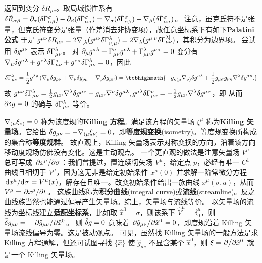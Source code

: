 返回到变分 $\delta R_{\mu\nu}$。取局域惯性系有 $\delta\tilde R_{\alpha\beta} = \tilde{\partial}_\sigma(\delta\tilde\Gamma^\sigma_{\alpha\beta})-\tilde{\partial}_\beta(\delta\tilde \Gamma^\sigma_{\alpha\sigma}) = \nabla_\sigma(\delta\tilde\Gamma^\sigma_{\alpha\beta})-\nabla_\beta(\delta\tilde \Gamma^\sigma_{\alpha\sigma})$。
注意，虽克氏符不是张量，但克氏符变分是张量（作差消去非协变项），故任意坐标系下有如下\textbf{Palatini 公式}
于是 $g^{\mu\nu}\var R_{\mu\nu}=2 \nabla_{[\lambda}( g^{\mu\nu} \delta \Gamma_{\nu]\mu}^\lambda) =2\nabla_\lambda(g^{\mu [\nu} \delta \Gamma_{\mu \nu}^{\lambda]})$，其积分为边界项。
尝试用 $\var g^{\mu\nu}$ 表示 $\var\Gamma_{\mu \nu}^\lambda$。
对 $\partial_\mu g^{\sigma\lambda}+\Gamma^\sigma_{\mu\nu} g^{\nu\lambda}+\Gamma^\lambda_{\mu\nu} g^{\nu\sigma}=0$ 变分有 $\nabla_\mu \delta g^{\sigma\lambda}+g^{\nu\lambda}\delta \Gamma^\sigma_{\mu\nu} +g^{\nu\sigma}\delta \Gamma^\lambda_{\mu\nu} =0$，因此
\[\var\Gamma_{\mu \nu}^\lambda=
\frac12 g^{\lambda\rho}
\left(
\cd_\mu \delta g_{\rho\nu}
+
\cd_\nu \delta g_{\rho\mu}
-
\cd_\rho \delta g_{\mu\nu}
\right)
=\tcbhighmath{
    -g_{\kappa(\mu} \cd_{\nu)}\delta g^{\kappa \lambda}+\frac 12 g_{\mu \sigma} g_{\nu \kappa} \cd^\lambda\delta g^{\sigma\kappa}.
}\]
故 $g^{\mu \nu} \delta \Gamma_{\mu \nu}^{\lambda}=\frac12 g_{\mu\nu}\nabla^\lambda \delta g^{\mu\nu}-g_{\mu\nu}\nabla^\nu\delta g^{\mu\lambda},g^{\mu \lambda} \delta \Gamma_{\mu \nu}^{\nu}=-\frac12 g_{\mu\nu}\nabla^\lambda \delta g^{\mu\nu}$，即
从而 $\partial\delta g=0$ 的确与 $\var\Gamma_{\mu \nu}^\lambda$ 等价。



$\nabla_{(\mu}\xi_{\nu)}=0$ 称为该度规的\textbf{Killing 方程}。满足该方程的矢量场 $\xi^\mu$ 称为\textbf{Killing 矢量场}。它给出 $\bar\var g_{\mu\nu}=-\nabla_{(\mu}\xi_{\nu)}=0$，即\textbf{等度规变换}(isometry)。等度规变换所构成的集合称\textbf{等度规群}。
故直观上，Killing 矢量场表示对称变换的方向，沿着该方向移动度规场仿佛没有变化。这是主动观点。
一个更直观的做法是注意矢量场 $V^\mu$ 总可写成 $\pdv*{x^\mu}{\sigma}$：我们曾提过，置连续切矢场 $V^\mu$，给定点 $p$，必经有唯一 $C^1$ 曲线且相切于 $V^\mu$，因为这无非是给定初始条件 $x^\mu(0)$ 并求解一阶常微分方程 $\dv*{x^\mu}{\sigma}=V^\mu(x)$，解存在且唯一。改变初始条件给出一族曲线 $x^\mu(\sigma,a)$，从而 $V^\mu=\pdv*{x^\mu}{t}$。
这族曲线称为\textbf{积分曲线}(integral curve)或\textbf{流线}(streamline)。反之曲线族当然也能通过偏导产生矢量场。综上，矢量场与流线等价。
以矢量场的流线为坐标线建立\textbf{适配坐标系}，比如取 $\hat x^0 = \sigma$，则该系下 $\hat V^\mu=\delta^\mu_0$，则 $\bar\var g_{\mu\nu} = -\pdv*{\hat g_{\mu\nu}}{\hat x^0}$。
则 $\bar\var g=0$ 意味着 $\pdv*{\hat g_{\mu\nu}}{\hat x^0}=0$，即度规沿着 Killing 矢量场流线偏导为零。这是被动观点。
可见，虽然找 Killing 矢量场的一般方法是求 Killing 方程通解，但还可试图寻找 $\{\hat x\}$ 使 $\hat g_{\mu\nu}$ 不显含某个 $\hat x^0$，则 $\xi=\pdv*{\hat x^0}$ 就是一个 Killing 矢量场。

